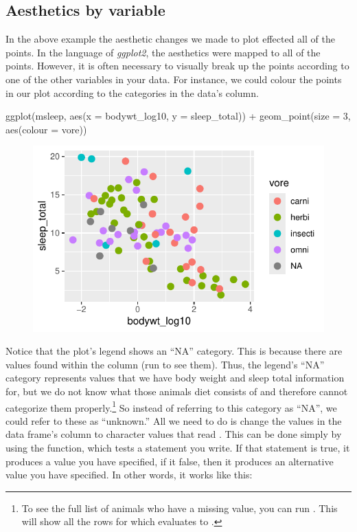 \subsection{Aesthetics by variable}

In the above example the aesthetic changes we made to plot effected all of the points. In the language of \textit{ggplot2}, the aesthetics were mapped to all of the points. However, it is often necessary to visually break up the points according to one of the other variables in your data.  For instance, we could colour the points in our plot according to the categories in the data's  column.

\begin{inR}
ggplot(msleep, aes(x = bodywt_log10, y = sleep_total)) +
    geom_point(size = 3, aes(colour = vore))
\end{inR}

\vspace{2em}

\begin{figure}[H]
\includegraphics[scale = 0.75]{graphics/ch2Figs/ggEx_7.pdf}
\end{figure}

\noindent
Notice that the plot's legend shows an ``NA'' category. This is because there are  values found within the  column (run  to see them). Thus, the legend's ``NA'' category represents values that we have body weight and sleep total information for, but we do not know what those animals diet consists of and therefore cannot categorize them properly.\footnote{To see the full list of animals who have a missing  value, you can run . This will show all the rows for which  evaluates to .} So instead of referring to this category as ``NA'', we could refer to these as ``unknown.'' All we need to do is change the  values in the data frame's  column to character values that read . This can be done simply by using the  function, which tests a statement you write. If that statement is true, it produces a value you have specified, if it false, then it produces an alternative value you have specified.  In other words, it works like this: 

